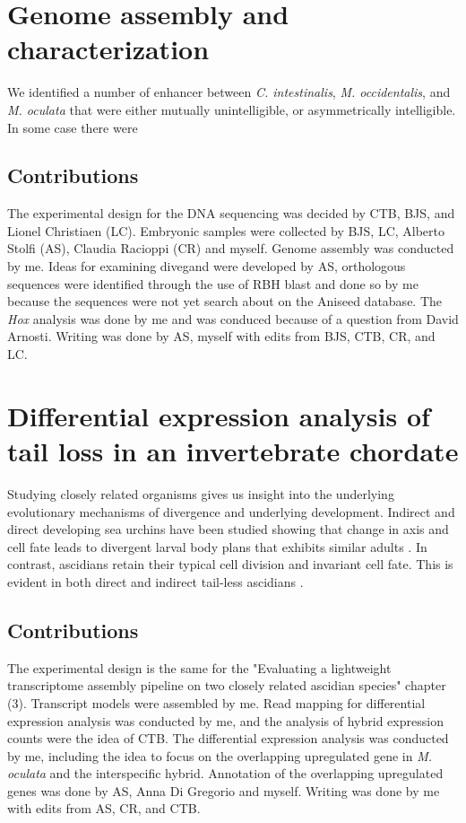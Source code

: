 \section{Genome assembly and characterization}
We identified a number of enhancer between \textit{C. intestinalis}, \textit{M. occidentalis}, and \textit{M. oculata} that were either mutually unintelligible, or asymmetrically intelligible. In some case there were 

\subsection{Contributions}
The experimental design for the DNA sequencing was decided by CTB, BJS, and Lionel Christiaen (LC). Embryonic samples were collected by BJS, LC, Alberto Stolfi (AS), Claudia Racioppi (CR) and myself. Genome assembly was conducted by me. Ideas for examining divegand were developed by AS, orthologous sequences were identified through the use of RBH blast and done so by me because the sequences were not yet search about on the Aniseed database. The \textit{Hox} analysis was done by me and was conduced because of a question from David Arnosti. Writing was done by AS, myself with edits from BJS, CTB, CR, and LC.

\section{Differential expression analysis of tail loss in an invertebrate chordate}
Studying closely related organisms gives us insight into the underlying evolutionary mechanisms of divergence and underlying development. Indirect and direct developing sea urchins have been studied showing that change in axis and cell fate leads to divergent larval body plans that exhibits similar adults \cite{wray_evolutionary_1989,henry_evolutionary_1990}. In contrast, ascidians retain their typical cell division and invariant cell fate. This is evident in both direct and indirect tail-less ascidians \cite{jeffery_evolutionary_1991,maliska_molgula_2010}. 
\subsection{Contributions}
The experimental design is the same for the "Evaluating a lightweight transcriptome assembly pipeline on two closely related ascidian species" chapter (3). Transcript models were assembled by me. Read mapping for differential expression analysis was conducted by me, and the analysis of hybrid expression counts were the idea of CTB. The differential expression analysis was conducted by me, including the idea to focus on the overlapping upregulated gene in \textit{M. oculata} and the interspecific hybrid. Annotation of the overlapping upregulated genes was done by AS, Anna Di Gregorio and myself. Writing was done by me with edits from AS, CR, and CTB.
  
